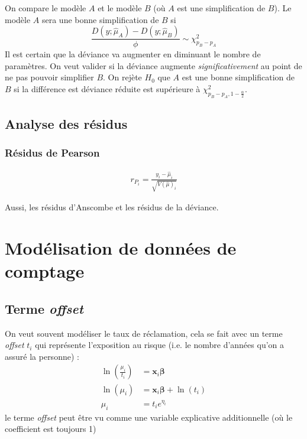 \documentclass[10pt, french]{article}
\begin{document}
\begin{multicols*}{3}
\label{sssec:analyse_deviance}

On compare le modèle $A$ et le modèle $B$ (où $A$ est une simplification de $B$). 
Le modèle $A$ sera une bonne simplification de $B$ si
\[
	\frac{D(y ; \hat{\mu}_A) - D(y ; \hat{\mu}_B)}{\phi}  \sim \chi_{p_B - p_A}^2  
\]
Il est certain que la déviance va augmenter en diminuant le nombre de paramètres. 
On veut valider si la déviance augmente \emph{significativement} au point de ne pas pouvoir simplifier $B$. 
On rejète $H_0$ que $A$ est une bonne simplification de $B$ si la différence est déviance réduite est supérieure à $\chi_{p_B - p_A, 1 - \frac{\alpha}{2}}^2$.


\subsection*{Analyse des résidus}

\subsubsection*{Résidus de Pearson}

\begin{align*}
	r_{P_i} 
		=	\frac{y_i - \hat{\mu}_i}{\sqrt{V(\hat{\mu})_i}}
\end{align*}

Aussi, les résidus d'Anscombe et les résidus de la déviance.




\section{Modélisation de données de comptage}

\subsection*{Terme \emph{offset}}
On veut souvent modéliser le taux  de réclamation, cela se fait avec un terme \emph{offset} $t_i$ qui représente l'exposition au risque (i.e. le nombre d'années qu'on a assuré la personne) : 
\begin{align*}
\ln \left( \frac{\mu_i}{t_i} \right) & = \bm{x}_i \bm{\beta} \\
\ln (\mu_i) & = \bm{x}_i \bm{\beta} + \ln (t_i) \\
\mu_i & = t_i e^{\eta_i}
\end{align*}
le terme \emph{offset} peut être vu comme une variable explicative additionnelle (où le coefficient est toujours 1)


\end{multicols*}
\end{document}
